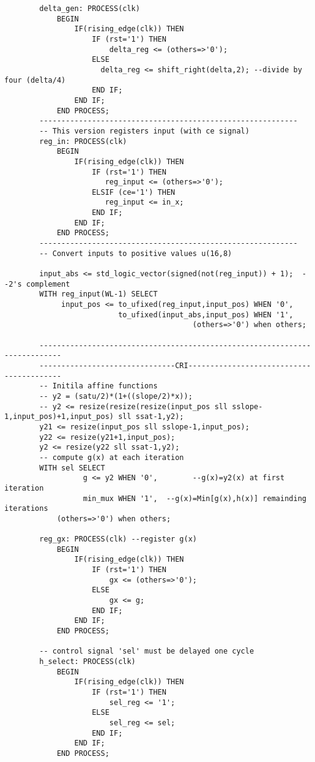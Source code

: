 \begin{code}
\begin{verbatim}
        delta_gen: PROCESS(clk)
            BEGIN
                IF(rising_edge(clk)) THEN
                    IF (rst='1') THEN
                        delta_reg <= (others=>'0');
                    ELSE
                      delta_reg <= shift_right(delta,2); --divide by four (delta/4)
                    END IF;
                END IF;
            END PROCESS;
        -----------------------------------------------------------
        -- This version registers input (with ce signal)
        reg_in: PROCESS(clk)
            BEGIN
                IF(rising_edge(clk)) THEN
                    IF (rst='1') THEN
                       reg_input <= (others=>'0');
                    ELSIF (ce='1') THEN
                       reg_input <= in_x;
                    END IF;
                END IF;
            END PROCESS;
        -----------------------------------------------------------	
        -- Convert inputs to positive values u(16,8)

        input_abs <= std_logic_vector(signed(not(reg_input)) + 1);  --2's complement
        WITH reg_input(WL-1) SELECT
             input_pos <= to_ufixed(reg_input,input_pos) WHEN '0', 
                          to_ufixed(input_abs,input_pos) WHEN '1',
                                           (others=>'0') when others;
                         
        ---------------------------------------------------------------------------
        -------------------------------CRI-----------------------------------------
        -- Initila affine functions
        -- y2 = (satu/2)*(1+((slope/2)*x));
        -- y2 <= resize(resize(resize(input_pos sll sslope-1,input_pos)+1,input_pos) sll ssat-1,y2);
        y21 <= resize(input_pos sll sslope-1,input_pos);
        y22 <= resize(y21+1,input_pos);
        y2 <= resize(y22 sll ssat-1,y2);
        -- compute g(x) at each iteration
        WITH sel SELECT
                  g <= y2 WHEN '0',        --g(x)=y2(x) at first iteration
                  min_mux WHEN '1',  --g(x)=Min[g(x),h(x)] remainding iterations
            (others=>'0') when others;
        
        reg_gx: PROCESS(clk) --register g(x)
            BEGIN
                IF(rising_edge(clk)) THEN
                    IF (rst='1') THEN
                        gx <= (others=>'0');
                    ELSE
                        gx <= g;
                    END IF;
                END IF;
            END PROCESS;
        
        -- control signal 'sel' must be delayed one cycle
        h_select: PROCESS(clk)
            BEGIN
                IF(rising_edge(clk)) THEN
                    IF (rst='1') THEN
                        sel_reg <= '1';
                    ELSE
                        sel_reg <= sel;
                    END IF;
                END IF;
            END PROCESS;	
        

\end{verbatim}
\end{code}

